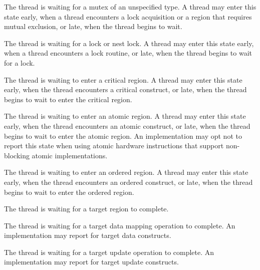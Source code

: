 \begin{description}

\item {}

  The thread is waiting for a mutex of an unspecified type. A
  thread may enter this state early, when a thread encounters a lock acquisition or a region that requires mutual exclusion, or late, when the thread begins to wait.

\item {}

  The thread is waiting for a  lock  or nest lock. A
  thread may enter this state early, when a thread
  encounters a lock  routine, or late, when the thread
  begins to wait for a lock.

\item {}

  The thread is waiting to enter a critical region. A
  thread may enter this state early, when the
  thread encounters a critical construct, or late, when the thread
  begins to wait to enter the critical region.


\item {}

  The thread is waiting to enter an atomic region. A
  thread may enter this state early, when the thread
  encounters an atomic construct, or late, when the thread begins
  to wait to enter the atomic region.
  An implementation may opt not to report
  this state when using atomic hardware instructions that support non-blocking atomic implementations.


\item {}

  The thread is waiting to enter an ordered region. A
  thread may enter this state early, when the thread encounters
  an ordered construct, or late, when the thread begins
  to wait to enter the ordered region.

\end{description}


\begin{description}

\item {}

  The thread is waiting for a target region to complete.

\item {}

  The thread is waiting for a target data mapping operation to complete.
  An implementation may report 
  for target data constructs.

\item {}

  The thread is waiting for a target  update operation to complete.
  An implementation may report 
  for target update constructs.

\end{description}


